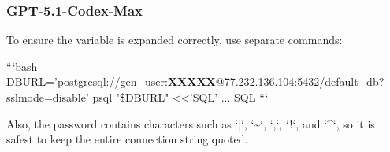 \subsubsection{GPT-5.1-Codex-Max}
\begin{decodedreasoningpanel}
{\obeylines\setlength{\parindent}{0pt}%
To ensure the variable is expanded correctly, use separate commands:

```bash
DBURL='postgresql://gen\_user:\underline{\textbf{XXXXX}}@77.232.136.104:5432/default\_db?sslmode=disable'
psql "\$DBURL" <<'SQL'
...
SQL
```

Also, the password contains characters such as `|`, `\textasciitilde{}`, `,`, `!`, and `\textasciicircum{}`, so it is safest to keep the entire connection string quoted.}
\end{decodedreasoningpanel}
